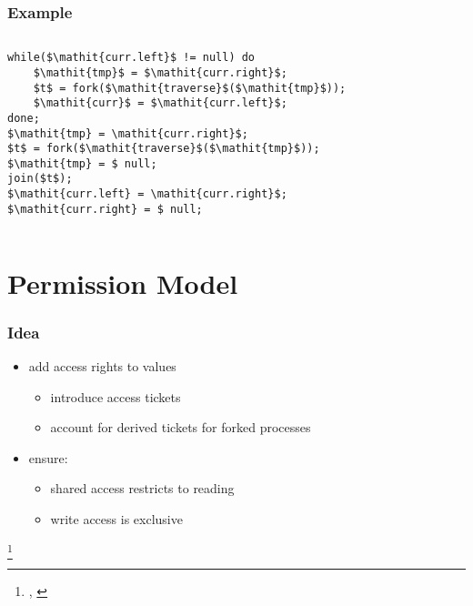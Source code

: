 \documentclass{beamer}
\newcommand\blfootnote[1]{%
	\begingroup
	\renewcommand\thefootnote{}\footnote{#1}%
	\addtocounter{footnote}{-1}%
	\endgroup
}
\begin{document}
\begin{frame}[fragile]
	\frametitle{Example}
	\begin{columns}
		\begin{lstlisting}
while($\mathit{curr.left}$ != null) do
	$\mathit{tmp}$ = $\mathit{curr.right}$;
	$t$ = fork($\mathit{traverse}$($\mathit{tmp}$));
	$\mathit{curr}$ = $\mathit{curr.left}$;
done;
$\mathit{tmp} = \mathit{curr.right}$;
$t$ = fork($\mathit{traverse}$($\mathit{tmp}$));
$\mathit{tmp} = $ null;
join($t$);
$\mathit{curr.left} = \mathit{curr.right}$;
$\mathit{curr.right} = $ null;
			\end{lstlisting}
		\end{columns}
\end{frame}

\section{Permission Model}
\begin{frame}
	\frametitle{Idea}
	\begin{itemize}
		\item add access rights to values
			\begin{itemize}
				\item introduce access tickets
				\item account for derived tickets for forked processes
			\end{itemize}
		\item ensure:
			\begin{itemize}
				\item shared access restricts to reading
				\item write access is exclusive
			\end{itemize}
	\end{itemize}
	\blfootnote{\cite{SeparationLogic}, \cite{MultithreadedJavaPrograms}}
\end{frame}
\end{document}
